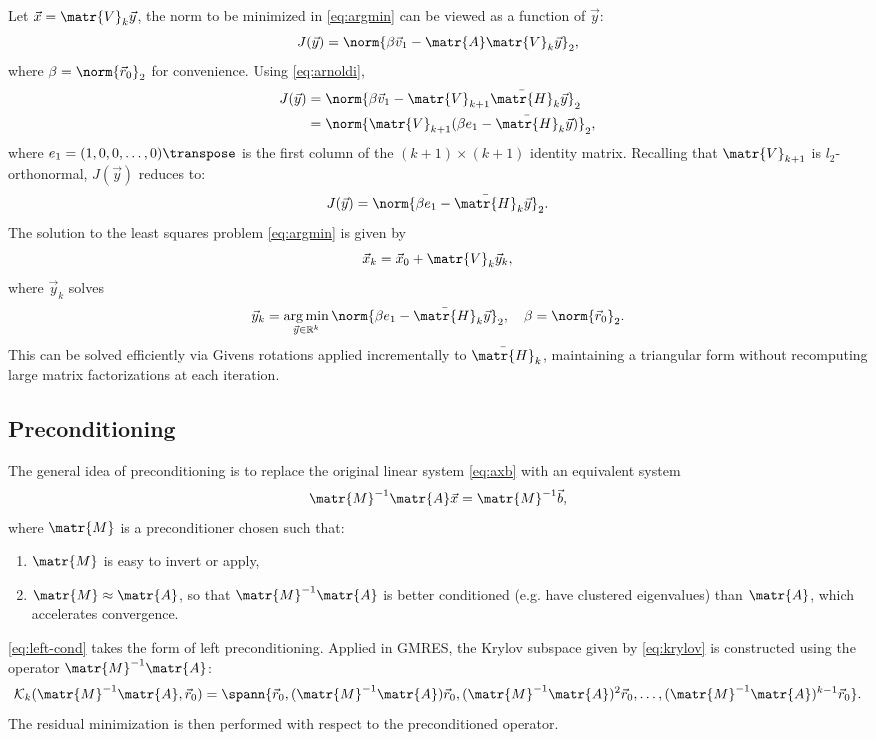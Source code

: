 Let \(\vec{x} = \matr{V}_k \vec{y}\), the norm to be minimized in \eqref{eq:argmin} can be
viewed as a function of \(\vec{y}\): \[J(\vec{y}) = \norm{\beta \vec{v}_1 -
    \matr{A} \matr{V}_k \vec{y}}_2 ,\] where \(\beta = \norm{\vec{r}_0}_2\) for convenience. Using
\eqref{eq:arnoldi},
\begin{align*}
  J(\vec{y}) & = \norm{\beta \vec{v}_1 - \matr{V}_{k+1} \bar{\matr{H}}_k \vec{y}}_2 \\
  & = \norm{\matr{V}_{k+1} (\beta e_1 - \bar{\matr{H}}_k \vec{y})}_2 ,
\end{align*}
where \(e_1 = (1, 0, 0, \dots, 0)\transpose\) is the first column of the \((k+1) \times
(k+1)\) identity matrix. Recalling that \(\matr{V}_{k+1}\) is
\(l_2\)-orthonormal, \(J(\vec{y})\) reduces to: \[J(\vec{y}) = \norm{\beta e_1 -
    \bar{\matr{H}}_k \vec{y}}_2.\] The solution to the least squares problem
\eqref{eq:argmin} is given by
\begin{equation}
  \label{eq:gmres-ir}
  \vec{x}_k = \vec{x}_0 + \matr{V}_k \vec{y}_k,
\end{equation}
where \(\vec{y}_k\) solves \[\vec{y}_k = \argmin_{\vec{y} \in \mathbb{R}^k}
  \norm{\beta e_1 - \bar{\matr{H}}_k \vec{y}}_2, \quad \beta = \norm{\vec{r}_0}_2.\]
This can be solved efficiently via Givens rotations applied incrementally to
\(\bar{\matr{H}}_k\), maintaining a triangular form without recomputing large
matrix factorizations at each iteration.

\subsection{Preconditioning}
\label{sec:preconditioning-1}

The general idea of preconditioning is to replace the original linear system
\eqref{eq:axb} with an equivalent system
\begin{equation}
  \label{eq:left-cond}
  \matr{M}^{-1}\matr{A} \vec{x} = \matr{M}^{-1} \vec{b},
\end{equation}
where \(\matr{M}\) is a preconditioner chosen such that:
\begin{enumerate}
\item \(\matr{M}\) is easy to invert or apply,
\item \(\matr{M} \approx \matr{A}\), so that \(\matr{M}^{-1}\matr{A}\) is better
  conditioned (e.g. have clustered eigenvalues) than \(\matr{A}\), which
  accelerates convergence.
\end{enumerate}
\eqref{eq:left-cond} takes the form of left preconditioning. Applied in GMRES,
the Krylov subspace given by \eqref{eq:krylov} is constructed using the operator
\(\matr{M}^{-1}\matr{A}\):
\[
  \mathcal{K}_k(\matr{M}^{-1}\matr{A}, \vec{r}_0) = \spann{\vec{r}_0, (\matr{M}^{-1}\matr{A})\vec{r}_0,
    (\matr{M}^{-1}\matr{A})^2\vec{r}_0, \dots, (\matr{M}^{-1}\matr{A})^{k - 1}\vec{r}_0}.
\]
The residual minimization is then performed with respect to the preconditioned
operator.

